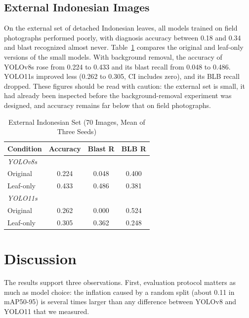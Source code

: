 \documentclass[conference,a4paper]{IEEEtran}
\begin{document}
\subsection{External Indonesian Images}
On the external set of detached Indonesian leaves, all models trained on field photographs performed poorly, with diagnosis accuracy between 0.18 and 0.34 and blast recognized almost never. Table~\ref{tab:ext} compares the original and leaf-only versions of the small models. With background removal, the accuracy of YOLOv8s rose from 0.224 to 0.433 and its blast recall from 0.048 to 0.486. YOLO11s improved less (0.262 to 0.305, CI includes zero), and its BLB recall dropped. These figures should be read with caution: the external set is small, it had already been inspected before the background-removal experiment was designed, and accuracy remains far below that on field photographs.

\begin{table}[htbp]
\caption{External Indonesian Set (70 Images, Mean of Three Seeds)}
\begin{center}
\setlength{\tabcolsep}{4pt}
\begin{tabular}{|l|c|c|c|}
\hline
\textbf{Condition} & \textbf{Accuracy} & \textbf{Blast R} & \textbf{BLB R} \\
\hline
\multicolumn{4}{|l|}{\textit{YOLOv8s}} \\
\hline
Original & 0.224 & 0.048 & 0.400 \\
Leaf-only & 0.433 & 0.486 & 0.381 \\
\hline
\multicolumn{4}{|l|}{\textit{YOLO11s}} \\
\hline
Original & 0.262 & 0.000 & 0.524 \\
Leaf-only & 0.305 & 0.362 & 0.248 \\
\hline
\end{tabular}
\par\vspace{2pt}{\scriptsize Leaf-only: segmentation fell back to the original image for 2.9\% of photos.}
\label{tab:ext}
\end{center}
\end{table}

\section{Discussion}

The results support three observations. First, evaluation protocol matters as much as model choice: the inflation caused by a random split (about 0.11 in mAP50-95) is several times larger than any difference between YOLOv8 and YOLO11 that we measured.
\end{document}
